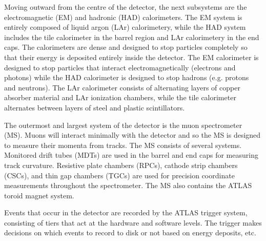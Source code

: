 Moving outward from the centre of the detector, the next subsystems are the electromagnetic (EM) and hadronic (HAD) calorimeters. The EM system is entirely composed of liquid argon (LAr) calorimetery, while the HAD system includes the tile calorimeter in the barrel region and LAr calorimetery in the end caps. The calorimeters are dense and designed to stop particles completely so that their energy is deposited entirely inside the detector. The EM calorimeter is designed to stop particles that interact electromagnetically (electrons and photons) while the HAD calorimeter is designed to stop hadrons (e.g. protons and neutrons). The LAr calorimeter consists of alternating layers of copper absorber material and LAr ionization chambers, while the tile calorimeter alternates between layers of steel and plastic scintillators. 

The outermost and largest system of the detector is the muon spectrometer (MS). Muons will interact minimally with the detector and so the MS is designed to measure their momenta from tracks. The MS consists of several systems. Monitored drift tubes (MDTs) are used in the barrel and end caps for measuring track curvature. Resistive plate chambers (RPCs), cathode strip chambers (CSCs), and thin gap chambers (TGCs) are used for precision coordinate measurements throughout the spectrometer. The MS also contains the ATLAS toroid magnet system.

Events that occur in the detector are recorded by the ATLAS trigger system, consisting of tiers that act at the hardware and software levels. The trigger makes decisions on which events to record to disk or not based on energy deposits, etc. 

\clearpage

